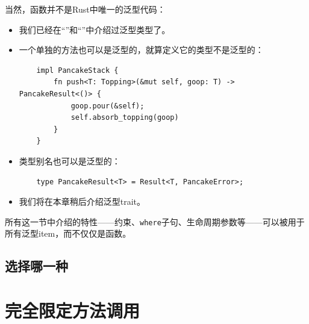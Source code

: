 当然，函数并不是Rust中唯一的泛型代码：
\begin{itemize}
    \item 我们已经在“”和“”中介绍过泛型类型了。
    \item 一个单独的方法也可以是泛型的，就算定义它的类型不是泛型的：
    \begin{verbatim}
    impl PancakeStack {
        fn push<T: Topping>(&mut self, goop: T) -> PancakeResult<()> {
            goop.pour(&self);
            self.absorb_topping(goop)
        }
    }
    \end{verbatim}
    \item 类型别名也可以是泛型的：
    \begin{verbatim}
    type PancakeResult<T> = Result<T, PancakeError>;
    \end{verbatim}
    \item 我们将在本章稍后介绍泛型trait。
\end{itemize}

所有这一节中介绍的特性——约束、\texttt{where}子句、生命周期参数等——可以被用于所有泛型item，而不仅仅是函数。

\subsection{选择哪一种}

\section{完全限定方法调用}\label{fullymethod}

